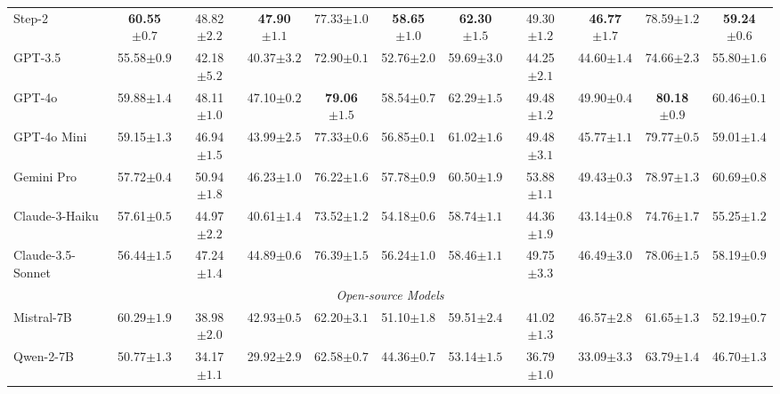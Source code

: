 \begin{table*}[htbp]
{\begin{tabular}{lcccccccccc}
Step-2 & \textbf{60.55\tiny{$\pm0.7$}} & 48.82\tiny{$\pm2.2$} & \textbf{47.90\tiny{$\pm1.1$}} & 77.33\tiny{$\pm1.0$} & \textbf{58.65\tiny{$\pm1.0$}} & \textbf{62.30\tiny{$\pm1.5$}} & 49.30\tiny{$\pm1.2$} & \textbf{46.77\tiny{$\pm1.7$}} & 78.59\tiny{$\pm1.2$} & \textbf{59.24\tiny{$\pm0.6$}}\\
GPT-3.5 & 55.58\tiny{$\pm0.9$} & 42.18\tiny{$\pm5.2$} & 40.37\tiny{$\pm3.2$} & 72.90\tiny{$\pm0.1$} & 52.76\tiny{$\pm2.0$} & 59.69\tiny{$\pm3.0$} & 44.25\tiny{$\pm2.1$} & 44.60\tiny{$\pm1.4$} & 74.66\tiny{$\pm2.3$} & 55.80\tiny{$\pm1.6$}\\
GPT-4o & 59.88\tiny{$\pm1.4$} & 48.11\tiny{$\pm1.0$} & 47.10\tiny{$\pm0.2$} & \textbf{79.06\tiny{$\pm1.5$}} & 58.54\tiny{$\pm0.7$} & 62.29\tiny{$\pm1.5$} & 49.48\tiny{$\pm1.2$} & 49.90\tiny{$\pm0.4$} & \textbf{80.18\tiny{$\pm0.9$}} & 60.46\tiny{$\pm0.1$}\\
GPT-4o Mini & 59.15\tiny{$\pm1.3$} & 46.94\tiny{$\pm1.5$} & 43.99\tiny{$\pm2.5$} & 77.33\tiny{$\pm0.6$} & 56.85\tiny{$\pm0.1$} & 61.02\tiny{$\pm1.6$} & 49.48\tiny{$\pm3.1$} & 45.77\tiny{$\pm1.1$} & 79.77\tiny{$\pm0.5$} & 59.01\tiny{$\pm1.4$}\\
Gemini Pro & 57.72\tiny{$\pm0.4$} & 50.94\tiny{$\pm1.8$} & 46.23\tiny{$\pm1.0$} & 76.22\tiny{$\pm1.6$} & 57.78\tiny{$\pm0.9$} & 60.50\tiny{$\pm1.9$} & 53.88\tiny{$\pm1.1$} & 49.43\tiny{$\pm0.3$} & 78.97\tiny{$\pm1.3$} & 60.69\tiny{$\pm0.8$}\\
Claude-3-Haiku & 57.61\tiny{$\pm0.5$} & 44.97\tiny{$\pm2.2$} & 40.61\tiny{$\pm1.4$} & 73.52\tiny{$\pm1.2$} & 54.18\tiny{$\pm0.6$} & 58.74\tiny{$\pm1.1$} & 44.36\tiny{$\pm1.9$} & 43.14\tiny{$\pm0.8$} & 74.76\tiny{$\pm1.7$} & 55.25\tiny{$\pm1.2$}\\
Claude-3.5-Sonnet & 56.44\tiny{$\pm1.5$} & 47.24\tiny{$\pm1.4$} & 44.89\tiny{$\pm0.6$} & 76.39\tiny{$\pm1.5$} & 56.24\tiny{$\pm1.0$} & 58.46\tiny{$\pm1.1$} & 49.75\tiny{$\pm3.3$} & 46.49\tiny{$\pm3.0$} & 78.06\tiny{$\pm1.5$} & 58.19\tiny{$\pm0.9$}\\
\midrule
\multicolumn{11}{c}{\textit{Open-source Models}} \\
\midrule
Mistral-7B & 60.29\tiny{$\pm1.9$} & 38.98\tiny{$\pm2.0$} & 42.93\tiny{$\pm0.5$} & 62.20\tiny{$\pm3.1$} & 51.10\tiny{$\pm1.8$} & 59.51\tiny{$\pm2.4$} & 41.02\tiny{$\pm1.3$} & 46.57\tiny{$\pm2.8$} & 61.65\tiny{$\pm1.3$} & 52.19\tiny{$\pm0.7$}\\
Qwen-2-7B & 50.77\tiny{$\pm1.3$} & 34.17\tiny{$\pm1.1$} & 29.92\tiny{$\pm2.9$} & 62.58\tiny{$\pm0.7$} & 44.36\tiny{$\pm0.7$} & 53.14\tiny{$\pm1.5$} & 36.79\tiny{$\pm1.0$} & 33.09\tiny{$\pm3.3$} & 63.79\tiny{$\pm1.4$} & 46.70\tiny{$\pm1.3$}\\

\end{tabular}}
\end{table*}
